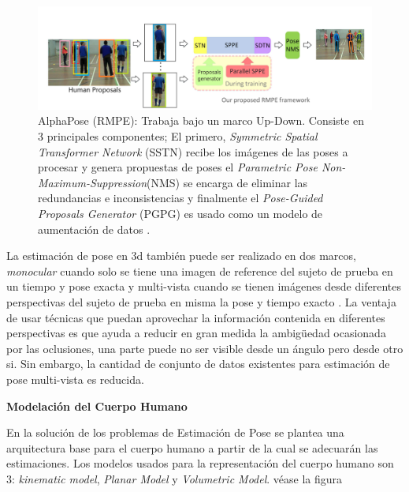 \begin{figure}[ht!]
    \centering
    \includegraphics[width=0.8 \textwidth]{Chapters/1. Pose Estimation/figures/alpha-pose.png}
    \caption{AlphaPose (RMPE): Trabaja bajo un marco Up-Down. Consiste en 3 principales componentes;
            El primero, \textit{Symmetric Spatial Transformer Network} (SSTN) recibe los imágenes de
            las poses a procesar y genera propuestas de poses el
            \textit{Parametric Pose Non-Maximum-Suppression}(NMS) se encarga de eliminar las
            redundancias e inconsistencias y finalmente el \textit{Pose-Guided Proposals Generator}
            (PGPG) es usado como un modelo de aumentación de datos
            \cite{DBLP:journals/corr/FangXL16}.}
    \label{fig:alphapose}
\end{figure}

La estimación de pose en 3d también puede ser realizado en dos marcos, \textit{monocular}
cuando solo se tiene una imagen de reference del sujeto de prueba en un tiempo y pose exacta
\cite{DBLP:journals/corr/MartinezHRL17} \cite{8954163} \cite{DBLP:journals/corr/abs-2002-10322}
\cite{DBLP:journals/corr/abs-1711-08585} \cite{DBLP:journals/corr/abs-2004-11822}
y multi-vista cuando se tienen imágenes desde diferentes perspectivas del sujeto de prueba en misma
la pose y tiempo exacto \cite{DBLP:journals/corr/abs-1905-05754} \cite{DBLP:journals/corr/abs-1901-04111}
\cite{DBLP:journals/corr/abs-2004-06239}.
La ventaja de usar técnicas que puedan aprovechar la información contenida
en diferentes perspectivas es que ayuda a reducir en gran medida la ambigüedad ocasionada por las
oclusiones, una parte puede no ser visible desde un ángulo pero desde otro si. Sin embargo, la
cantidad de conjunto de datos existentes para estimación de pose multi-vista es reducida.


\textbf{Modelación del Cuerpo Humano}

En la solución de los problemas de Estimación de Pose se plantea una arquitectura base para el
cuerpo humano a partir de la cual se adecuarán las estimaciones. Los modelos usados para la
representación del cuerpo humano son 3: \textit{kinematic model}, \textit{Planar Model} y
\textit{Volumetric Model}. véase la figura

